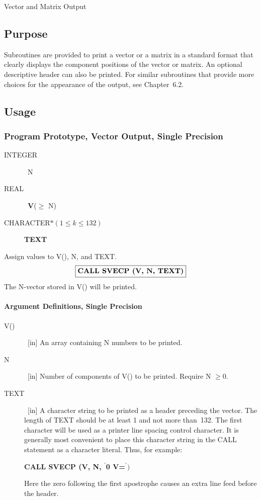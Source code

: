 \documentclass[twoside]{MATH77}
\begin{document}
  Vector and Matrix Output


\subsection{Purpose}

Subroutines are provided to print a vector or a matrix in a standard format
that clearly displays the component positions of the vector or matrix. An
optional descriptive header can also be printed. For similar subroutines
that provide more choices for the appearance of the output, see Chapter~6.2.

\subsection{Usage}

\subsubsection{Program Prototype, Vector Output, Single Precision}

\begin{description}

\item[INTEGER] \ N

\item[REAL] \ {\bf V}($\geq $ N)

\item[CHARACTER$*(1 \leq k \leq 132)$] {\bf TEXT}

\end{description}

Assign values to V(), N, and TEXT.
$$
\fbox{\bf CALL SVECP (V, N, TEXT)}
$$
The N-vector stored in V() will be printed.

\paragraph{Argument Definitions, Single Precision}

\begin{description}
\item[V()] \ [in] An array containing N numbers to be printed.

\item[N] \ [in] Number of components of V() to be printed. Require N $\geq 0.$

\item[TEXT] \ [in] A character string to be printed as a header preceding the vector.
The length of TEXT should be at least 1 and not more than~132. The first
character will be used as a printer line spacing control character. It is
generally most convenient to place this character string in the CALL
statement as a character literal. Thus, for example:

\centerline{{\bf CALL SVECP (V, N, $^\prime $0 V=$^\prime)$}}

Here the zero following the first apostrophe causes an extra line feed
before the header.
\end{description}
\end{document}
